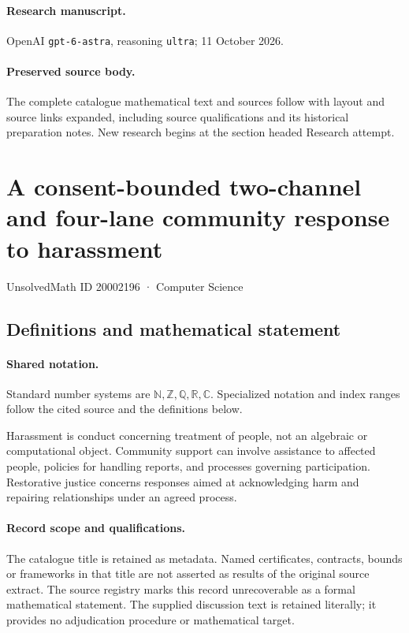 \documentclass[11pt]{article}
\begin{document}
\paragraph{Research manuscript.} OpenAI \texttt{gpt-6-astra}, reasoning \texttt{ultra}; 11 October 2026.
\paragraph{Preserved source body.} The complete catalogue mathematical text and sources follow with layout and source links expanded, including source qualifications and its historical preparation notes. New research begins at the section headed Research attempt.

\section{A consent-bounded two-channel and four-lane community response to harassment}\label{20002196}
{\small UnsolvedMath ID 20002196 · Computer Science}
\subsection{Definitions and mathematical statement}

\paragraph{Shared notation.}Standard number systems are $\mathbb N,\mathbb Z,\mathbb Q,\mathbb R,\mathbb C$. Specialized notation and index ranges follow the cited source and the definitions below.


Harassment is conduct concerning treatment of people, not an algebraic or computational object. Community support can involve assistance to affected people, policies for handling reports, and processes governing participation. Restorative justice concerns responses aimed at acknowledging harm and repairing relationships under an agreed process.
\paragraph{Record scope and qualifications.}
The catalogue title is retained as metadata. Named certificates, contracts, bounds or frameworks in that title are not asserted as results of the original source extract.
The source registry marks this record unrecoverable as a formal mathematical statement. The supplied discussion text is retained literally; it provides no adjudication procedure or mathematical target.
\end{document}
